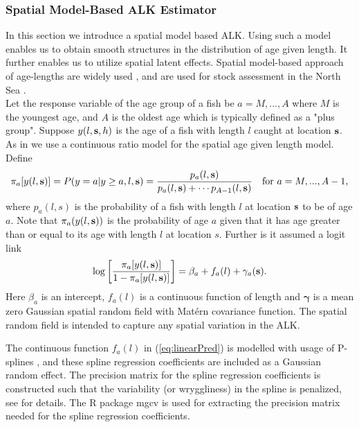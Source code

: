 \documentclass[a4paper 12pt]{article}
\numberwithin{equation}{section}
\begin{document}
\subsubsection{Spatial Model-Based ALK Estimator}
\label{sec:spatialModelALK}
In this section we introduce a spatial model based ALK. Using such a model enables us to obtain smooth structures in the distribution of age given length. It further enables us to utilize spatial latent effects. Spatial model-based approach of age-lengths are widely used \citep{berg2012spatial, hirst2012bayesian, rindorf2001analyses}, and are used for stock assessment in the North Sea \citep{berg2014evaluation}. \\ %
\indent Let the response variable of the age group of a fish be $a = M,...,A$ where $M$ is the youngest age, and $A$ is the oldest age which is typically defined as a "plus group". Suppose $y(l,{\bf s},h)$ is the age  of a fish with length $l$ caught at location ${\bf s}$. As in \citet{berg2012spatial} we use a continuous ratio model for the spatial age given length model. Define
\begin{align}\label{eq:linearPred1}
\pi_a[y(l,{\bf s})] = P(y = a|y \geq a, l, {\bf s}) = \frac{p_a(l,{\bf s})}{p_a(l,{\bf s}) + \cdots p_{A-1}(l,{\bf s})} \vspace{ 4mm} \ \ \ \text{for } a =M,...,A-1 ,
\end{align}
where $p_a(l,s)$ is the probability of a fish with length $l$ at location ${\bf s}$ to be of age $a$. Note that $\pi_a(y(l,{\bf s}))$ is the probability of age $a$ given that it has age greater than or equal to its age with length $l$ at location $s$. Further is it assumed a logit link
\begin{align}\label{eq:linearPred}
\log \left[ \frac{\pi_a[y(l,{\bf s})]}{1-\pi_a[y(l,{\bf s})]}\right] = \beta_a +  f_a(l) + \gamma_a({\bf s}).
\end{align}
Here $\beta_a$ is an intercept, $ f_a(l)$ is a continuous function of length and $\pmb{\gamma}$ is a mean zero Gaussian spatial random field with Mat\'{e}rn covariance function. The spatial random field is intended to capture any spatial variation in the ALK.

The continuous function $f_a(l)$ in (\ref{eq:linearPred}) is modelled with usage of P-splines \citep{wood2017generalized}, and these spline regression coefficients are included as a Gaussian random effect. The precision matrix for the spline regression coefficients is constructed such that the variability (or wryggliness) in the spline is penalized, see \citet[page 239]{wood2017generalized} for details. The R package mgcv \citep{wood2015package} is used for extracting the precision matrix needed for the spline regression coefficients.
\end{document}
